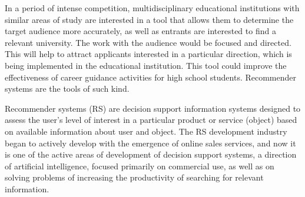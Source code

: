 \documentclass[conference]{IEEEtran}
\begin{document}


In a period of intense competition, multidisciplinary educational institutions with similar areas of study are interested in a tool that allows them to determine the target audience more accurately, as well as entrants are interested to find a relevant university.  The work with the audience would be focused and directed. This will help to attract applicants interested in a particular direction, which is being implemented in the educational institution.  This tool could improve the effectiveness of career guidance activities for high school students.  Recommender systems are the tools of such kind.

Recommender systems (RS) \cite{rs_basics} are decision support information systems designed to assess the user's level of interest in a particular product or service (object) based on available information about user and object.  The RS development industry began to actively develop with the emergence of online sales services, and now it is one of the active areas of development of decision support systems, a direction of artificial intelligence, focused primarily on commercial use, as well as on solving problems of increasing the productivity of searching for relevant information.
\end{document}
